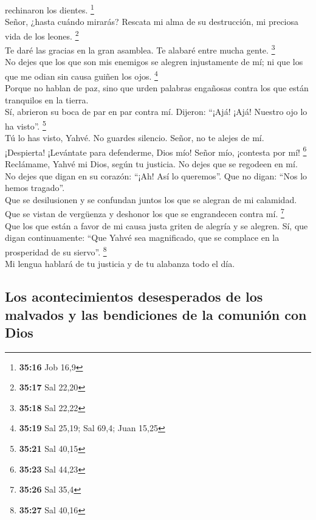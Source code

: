 rechinaron los dientes. \footnote{\textbf{35:16} Job 16,9}\\
 Señor, ¿hasta cuándo mirarás? Rescata mi alma de su
destrucción, mi preciosa vida de los leones. \footnote{\textbf{35:17}
  Sal 22,20}\\
 Te daré las gracias en la gran asamblea. Te alabaré
entre mucha gente. \footnote{\textbf{35:18} Sal 22,22}\\
 No dejes que los que son mis enemigos se alegren
injustamente de mí; ni que los que me odian sin causa guiñen los ojos.
\footnote{\textbf{35:19} Sal 25,19; Sal 69,4; Juan 15,25}\\
 Porque no hablan de paz, sino que urden palabras
engañosas contra los que están tranquilos en la tierra.\\
 Sí, abrieron su boca de par en par contra mí. Dijeron:
``¡Ajá! ¡Ajá! Nuestro ojo lo ha visto''. \footnote{\textbf{35:21} Sal
  40,15}\\
 Tú lo has visto, Yahvé. No guardes silencio. Señor, no
te alejes de mí.\\
 ¡Despierta! ¡Levántate para defenderme, Dios mío! Señor
mío, ¡contesta por mí! \footnote{\textbf{35:23} Sal 44,23}\\
 Reclámame, Yahvé mi Dios, según tu justicia. No dejes
que se regodeen en mí.\\
 No dejes que digan en su corazón: ``¡Ah! Así lo
queremos''. Que no digan: ``Nos lo hemos tragado''.\\
 Que se desilusionen y se confundan juntos los que se
alegran de mi calamidad. Que se vistan de vergüenza y deshonor los que
se engrandecen contra mí. \footnote{\textbf{35:26} Sal 35,4}\\
 Que los que están a favor de mi causa justa griten de
alegría y se alegren. Sí, que digan continuamente: ``Que Yahvé sea
magnificado, que se complace en la prosperidad de su siervo''.
\footnote{\textbf{35:27} Sal 40,16}\\
 Mi lengua hablará de tu justicia y de tu alabanza todo
el día.

\hypertarget{los-acontecimientos-desesperados-de-los-malvados-y-las-bendiciones-de-la-comuniuxf3n-con-dios}{%
\subsection{Los acontecimientos desesperados de los malvados y las
bendiciones de la comunión con
Dios}\label{los-acontecimientos-desesperados-de-los-malvados-y-las-bendiciones-de-la-comuniuxf3n-con-dios}}

